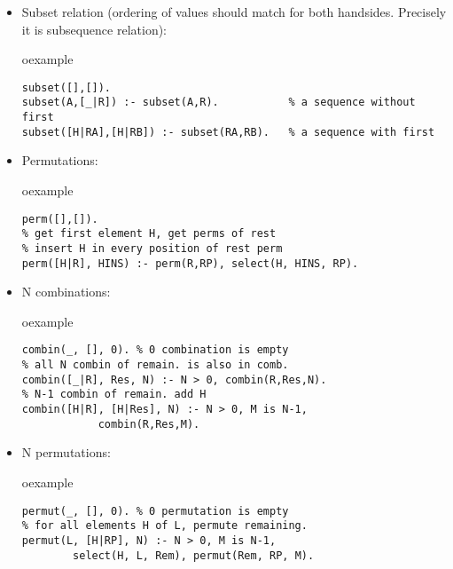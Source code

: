 \begin{frame}[fragile]
\begin{itemize}
\item Subset relation (ordering of values should match for both handsides.
Precisely it is subsequence relation):\\
\begin{beamercolorbox}{oexample}
\begin{lstlisting}[escapeinside=`']
subset([],[]).
subset(A,[_|R]) :- subset(A,R).           % a sequence without first
subset([H|RA],[H|RB]) :- subset(RA,RB).   % a sequence with first
\end{lstlisting}
\end{beamercolorbox}
\item Permutations:\\
\begin{beamercolorbox}{oexample}
\begin{lstlisting}[escapeinside=`']
% insert H to all positions in the remainder permutations
perm([],[]).
% get first element H, get perms of rest
% insert H in every position of rest perm
perm([H|R], HINS) :- perm(R,RP), select(H, HINS, RP).
\end{lstlisting}
\end{beamercolorbox}
\end{itemize}
\end{frame}

\begin{frame}[fragile]
\begin{itemize}
\item N combinations:\\
\begin{beamercolorbox}{oexample}
\begin{lstlisting}[escapeinside=`']
combin(_, [], 0). % 0 combination is empty
% all N combin of remain. is also in comb.
combin([_|R], Res, N) :- N > 0, combin(R,Res,N).
% N-1 combin of remain. add H
combin([H|R], [H|Res], N) :- N > 0, M is N-1, 
            combin(R,Res,M).
\end{lstlisting}
\end{beamercolorbox}
\item N permutations:\\
\begin{beamercolorbox}{oexample}
\begin{lstlisting}[escapeinside=`']
permut(_, [], 0). % 0 permutation is empty
% for all elements H of L, permute remaining.
permut(L, [H|RP], N) :- N > 0, M is N-1, 
        select(H, L, Rem), permut(Rem, RP, M).
\end{lstlisting}
\end{beamercolorbox}
\end{itemize}
\end{frame}

